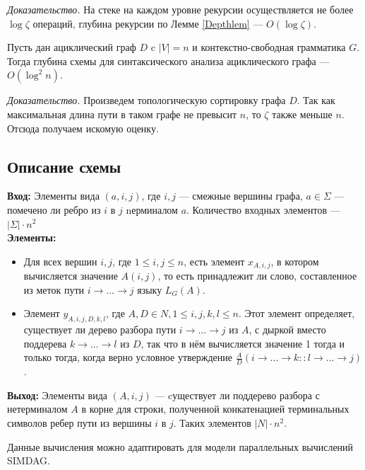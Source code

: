 \documentclass{spbau-diploma}
\begin{document}
\textit{Доказательство.} На стеке на каждом уровне рекурсии осуществляется не более $\log \zeta$ операций, глубина рекурсии по Лемме \ref{Depthlem} --- $O(\log \zeta)$.
\begin{corollaryrus} Пусть дан ациклический граф $D$ c $|V|=n$ и контекстно-свободная грамматика $G$. Тогда  глубина схемы для синтаксического анализа ациклического графа --- $O(\log^2 n)$. 
\end{corollaryrus}
\textit{Доказательство.} Произведем топологическую сортировку графа $D$. Так как максимальная длина пути в таком графе не превысит $n$, то $\zeta$ также меньше $n$. Отсюда получаем искомую оценку. 
\subsection {Описание схемы} 
\textbf{Вход:} Элементы вида $(a, i, j)$, где $i, j$ --- смежные вершины графа, $a \in \Sigma$ --- помечено ли ребро из $i$ в $j$ nерминалом $a$. Количество входных элементов --- $|\Sigma| \cdot n^2$
\\
\newline\textbf{Элементы:}
\begin{itemize}
  \item Для всех вершин $i, j$, где $1 \leq i, j \leq n$, есть элемент $x_{A, i, j}$, в котором вычисляется значение $A(i, j)$, то есть принадлежит ли слово, составленное из меток пути $i \rightarrow ...  \rightarrow j$ языку $L_G(A).$
  \item Элемент $y_{A,i,j,D,k,l}$, где $A, D \in N, 1 \leq i, j, k, l \leq n $. Этот элемент определяет, существует ли дерево разбора пути $i  \rightarrow ...  \rightarrow j$ из $A$, с дыркой вместо поддерева $k \rightarrow ...  \rightarrow l$ из $D$, так что в нём вычисляется значение 1 тогда и только тогда, когда верно условное утверждение $\frac{A}{D}(i \rightarrow... \rightarrow k :: l \rightarrow... \rightarrow j )$.
\end{itemize}
\textbf{Выход:} Элементы вида $(A, i, j)$ --- cуществует ли поддерево разбора с нетерминалом $A$ в корне для строки, полученной конкатенацией терминальных символов ребер пути из вершины $i$ в $j$. Таких элементов $|N| \cdot n^2$. \par
Данные вычисления можно адаптировать для модели параллельных вычислений SIMDAG.
\end{document}
